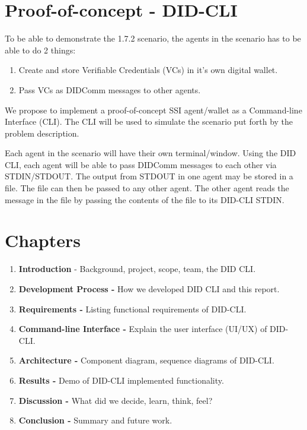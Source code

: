 \hypertarget{proof-of-concept---did-cli}{%
\section{Proof-of-concept - DID-CLI}\label{proof-of-concept---did-cli}}

To be able to demonstrate the 1.7.2 scenario, the agents in the scenario
has to be able to do 2 things:

\begin{enumerate}
\def\labelenumi{\arabic{enumi}.}
\tightlist
\item
  Create and store Verifiable Credentials (VCs) in it's own digital
  wallet.
\item
  Pass VCs as DIDComm messages to other agents.
\end{enumerate}

We propose to implement a proof-of-concept SSI agent/wallet as a
Command-line Interface (CLI). The CLI will be used to simulate the
scenario put forth by the problem description.

Each agent in the scenario will have their own terminal/window. Using
the DID CLI, each agent will be able to pass DIDComm messages to each
other via STDIN/STDOUT. The output from STDOUT in one agent may be
stored in a file. The file can then be passed to any other agent. The
other agent reads the message in the file by passing the contents of the
file to its DID-CLI STDIN.

\hypertarget{chapters}{%
\section{Chapters}\label{chapters}}

\begin{enumerate}
\def\labelenumi{\arabic{enumi}.}
\tightlist
\item
  \textbf{Introduction} - Background, project, scope, team, the DID CLI.
\item
  \textbf{Development Process -} How we developed DID CLI and this
  report.
\item
  \textbf{Requirements -} Listing functional requirements of DID-CLI.
\item
  \textbf{Command-line Interface -} Explain the user interface (UI/UX)
  of DID-CLI.
\item
  \textbf{Architecture -} Component diagram, sequence diagrams of
  DID-CLI.
\item
  \textbf{Results -} Demo of DID-CLI implemented functionality.
\item
  \textbf{Discussion -} What did we decide, learn, think, feel?
\item
  \textbf{Conclusion -} Summary and future work.
\end{enumerate}
